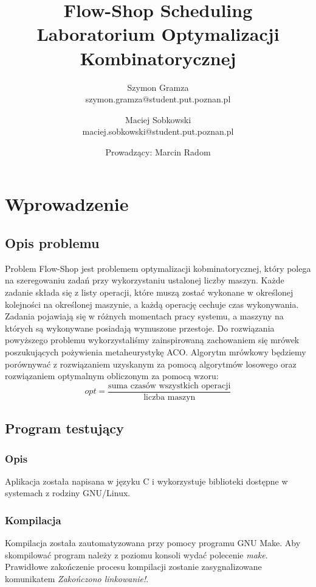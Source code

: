 \documentclass[10pt,a4paper]{article}
\title{Flow-Shop Scheduling\\Laboratorium Optymalizacji Kombinatorycznej}
\author{
  Szymon Gramza\\
  szymon.gramza@student.put.poznan.pl
\and
  Maciej Sobkowski\\
  maciej.sobkowski@student.put.poznan.pl
\and
  Prowadzący: Marcin Radom
}
\begin{document}
\maketitle
\section{Wprowadzenie}
\subsection{Opis problemu}
Problem Flow-Shop jest problemem optymalizacji kobminatorycznej, który polega na szeregowaniu zadań przy wykorzystaniu ustalonej liczby maszyn. Każde zadanie składa się z listy operacji, które muszą zostać wykonane w określonej kolejności na określonej maszynie, a każdą operację cechuje czas wykonywania. Zadania pojawiają się w różnych momentach pracy systemu, a maszyny na których są wykonywane posiadają wymuszone przestoje.
Do rozwiązania powyższego problemu wykorzystaliśmy zainspirowaną zachowaniem się mrówek poszukujących pożywienia metaheurystykę ACO. Algorytm mrówkowy będziemy porównywać z rozwiązaniem uzyskanym za pomocą algorytmów losowego oraz rozwiązaniem optymalnym obliczonym za pomocą wzoru: \[ opt = \frac{\text{suma czasów wszystkich operacji}}{\text{liczba maszyn}} \]

\subsection{Program testujący}
\subsubsection{Opis}
Aplikacja została napisana w języku C i wykorzystuje biblioteki dostępne w systemach z rodziny GNU/Linux. 
\subsubsection{Kompilacja}
Kompilacja została zautomatyzowana przy pomocy programu GNU Make. Aby skompilować program należy z poziomu konsoli wydać polecenie \textit{make}. Prawidłowe zakończenie procesu kompilacji zostanie zasygnalizowane komunikatem \textit{Zakończono linkowanie!}.
\end{document}
